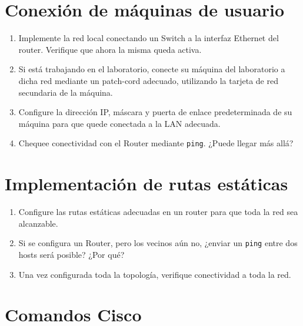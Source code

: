 \documentclass[a4paper,10pt]{article}
\begin{document}
\section{Conexión de máquinas de usuario}

\begin{enumerate}
    \item Implemente la red local conectando un Switch a la interfaz Ethernet del router. Verifique que ahora la misma queda activa.
    \item Si está trabajando en el laboratorio, conecte su máquina del laboratorio a dicha red mediante un patch-cord adecuado, utilizando la tarjeta de red secundaria de la máquina.
    \item Configure la dirección IP, máscara y puerta de enlace predeterminada de su máquina para que quede conectada a la LAN adecuada.
    \item Chequee conectividad con el Router mediante \texttt{ping}. ¿Puede llegar más allá?
\end{enumerate}

\section{Implementación de rutas estáticas}

\begin{enumerate}
    \item Configure las rutas estáticas adecuadas en un router para que toda la red sea alcanzable.
    \item Si se configura un Router, pero los vecinos aún no, ¿enviar un \texttt{ping} entre dos hosts será posible? ¿Por qué?
    \item Una vez configurada toda la topología, verifique conectividad a toda la red.
\end{enumerate}


\appendix

\section{Comandos Cisco}
\end{document}
